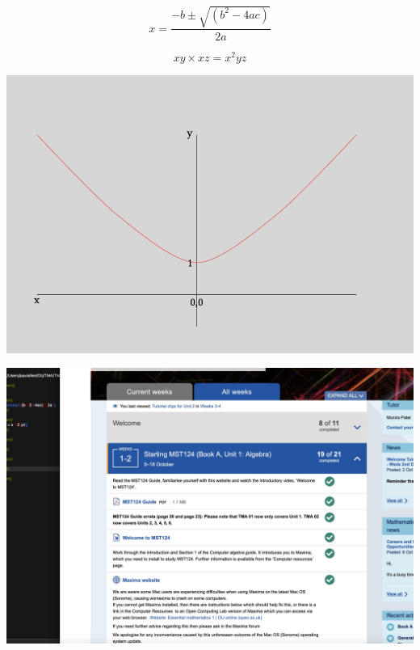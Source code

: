 \documentclass[a4paper]{tufte-handout}
\begin{document}

\begin{question}
\bigskip
\[x= \frac{-b\pm\sqrt{(b^{2}-4ac)}}{2a}\]
\end{question}

\begin{question}
\bigskip
\[xy \times xz = x^{2}yz\]
\end{question}

\begin{question}
\bigskip

\includegraphics{Graph.jpg}
\end{question}

\begin{question}

\bigskip
\includegraphics[scale=0.3]{screen_shot_TMA00.jpg}
\end{question}
\end{document}
